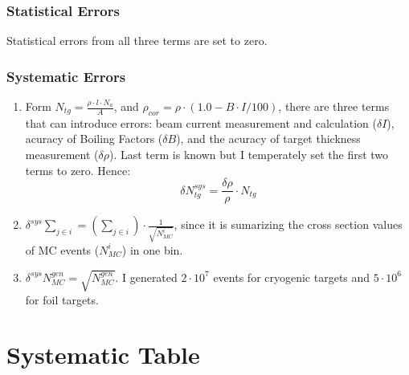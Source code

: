 \documentclass[a4paper,12.pt]{article}
\begin{document}
\subsubsection{Statistical Errors}
 Statistical errors from all three terms are set to zero.

\subsubsection{Systematic Errors}

\begin{enumerate}


\item Form $N_{tg} = \frac{\rho\cdot l \cdot N_{a}}{A}$, and $\rho_{cor} = \rho \cdot (1.0 - B \cdot I /100)$, there are three terms that can introduce errors: beam current measurement and calculation ($\delta I$), acuracy of Boiling Factors ($\delta B$), and the acuracy of target thickness measurement ($\delta \rho$). Last term is known but I temperately set the first two terms to zero. Hence:
 \begin{equation}
    \delta N^{sys}_{tg} = \frac{\delta\rho}{\rho} \cdot N_{tg}
 \end{equation} 

\item $\delta^{sys}\sum_{j\in i} = (\sum_{j\in i})\cdot\frac{1}{\sqrt{N_{MC}^{i}}}$, since it is sumarizing the cross section values of MC events ($N_{MC}^{i}$) in one bin.

\item $\delta^{sys} N_{MC}^{gen} = \sqrt{N_{MC}^{gen}}$. I generated $2\cdot 10^{7}$ events for cryogenic targets and $5\cdot 10^{6}$ for foil targets.

\end{enumerate}

 \section{Systematic Table}
 
\end{document}
